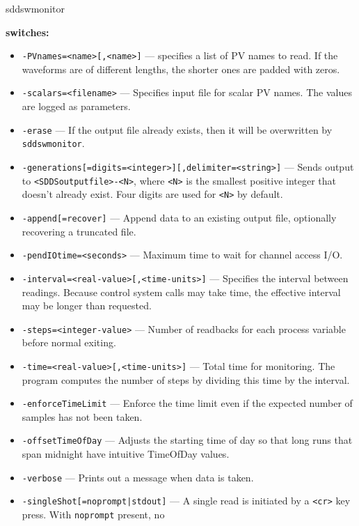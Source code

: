 \begin{sddsprog}{sddswmonitor}
%
\item {\bf switches:}
  \begin{itemize}
    \item {\verb+-PVnames=<name>[,<name>]+} ---
          specifies a list of PV names to read. If the waveforms are of different
          lengths, the shorter ones are padded with zeros.
    \item {\tt -scalars=<filename>} --- Specifies input file for scalar PV names.
          The values are logged as parameters.
    \item {\tt -erase} --- If the output file already exists, then it will be
          overwritten by \verb+sddswmonitor+.
    \item {\verb+-generations[=digits=<integer>][,delimiter=<string>]+} ---
          Sends output to \verb+<SDDSoutputfile>-<N>+, where \verb+<N>+ is the
          smallest positive integer that doesn't already exist. Four digits are
          used for \verb+<N>+ by default.
    \item {\tt -append[=recover]} --- Append data to an existing output file,
          optionally recovering a truncated file.
    \item {\tt -pendIOtime=<seconds>} --- Maximum time to wait for channel
          access I/O.
    \item {\tt -interval=<real-value>[,<time-units>]} --- Specifies the
          interval between readings. Because control system calls may take time,
          the effective interval may be longer than requested.
    \item {\tt -steps=<integer-value>} --- Number of readbacks for each process
          variable before normal exiting.
    \item {\tt -time=<real-value>[,<time-units>]} --- Total time for
          monitoring. The program computes the number of steps by dividing this
          time by the interval.
    \item {\tt -enforceTimeLimit} --- Enforce the time limit even if the
          expected number of samples has not been taken.
    \item {\tt -offsetTimeOfDay} --- Adjusts the starting time of day so that
          long runs that span midnight have intuitive TimeOfDay values.
    \item {\tt -verbose} --- Prints out a message when data is taken.
    \item {\verb+-singleShot[=noprompt|stdout]+} --- A single read is
          initiated by a \verb+<cr>+ key press. With \verb+noprompt+ present, no

\end{itemize}
\end{sddsprog}
